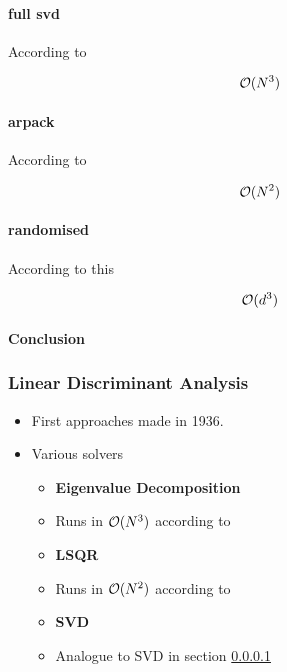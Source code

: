 \paragraph{full \gls{svd}} \label{svd}

According to \cite{wright2001large}

$$\mathcal{O}(N^3)$$

\clearpage

\paragraph{\gls{arpack}}

According to \cite{wright2001large}

$$\mathcal{O}(N^2)$$

\clearpage

\paragraph{randomised}

According to this \cite{HandsOnMLCh8}

$$\mathcal{O}(d^3)$$


\clearpage

\paragraph{Conclusion}



\clearpage




\subsubsection{Linear Discriminant Analysis}

\begin{itemize}
	\item First approaches made in 1936. \cite{fisher1936use}
	\item Various solvers
	\begin{itemize}
		\item \textbf{Eigenvalue Decomposition}
		\item Runs in $\mathcal{O}(N^3)$ according to \cite{cai2008training}
	\end{itemize}
	\begin{itemize}
		\item \textbf{LSQR}
		\item Runs in $\mathcal{O}(N^2)$ according to \cite{di2013new}
	\end{itemize}
		\begin{itemize}
		\item \textbf{SVD}
		\item Analogue to SVD in section \ref{svd}
	\end{itemize}
\end{itemize}


